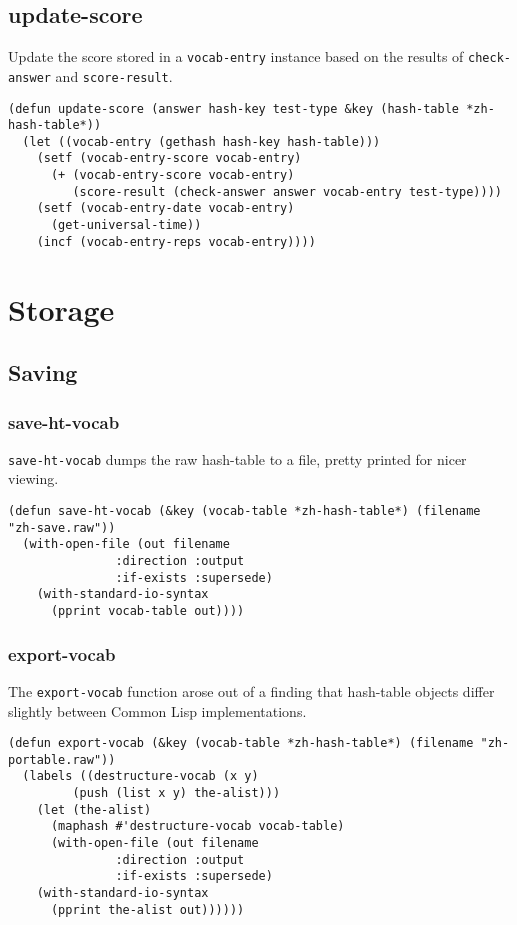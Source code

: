 \documentclass[11pt]{article}
\begin{document}
\subsection{update-score}
\label{sec-5-4}
Update the score stored in a \texttt{vocab-entry} instance based on the results of
\texttt{check-answer} and \texttt{score-result}.
\begin{verbatim}
(defun update-score (answer hash-key test-type &key (hash-table *zh-hash-table*))
  (let ((vocab-entry (gethash hash-key hash-table)))
    (setf (vocab-entry-score vocab-entry)
	  (+ (vocab-entry-score vocab-entry)
	     (score-result (check-answer answer vocab-entry test-type))))
    (setf (vocab-entry-date vocab-entry)
	  (get-universal-time))
    (incf (vocab-entry-reps vocab-entry))))
\end{verbatim}
\section{Storage}
\label{sec-6}
\subsection{Saving}
\label{sec-6-1}
\subsubsection*{save-ht-vocab}
\label{sec-6-1-1}
\texttt{save-ht-vocab} dumps the raw hash-table to a file, pretty printed for nicer viewing.
\begin{verbatim}
(defun save-ht-vocab (&key (vocab-table *zh-hash-table*) (filename "zh-save.raw"))
  (with-open-file (out filename
		       :direction :output
		       :if-exists :supersede)
    (with-standard-io-syntax
      (pprint vocab-table out))))
\end{verbatim}
\subsubsection*{export-vocab}
\label{sec-6-1-2}
The \texttt{export-vocab} function arose out of a finding that hash-table objects
differ slightly between Common Lisp implementations.
\begin{verbatim}
(defun export-vocab (&key (vocab-table *zh-hash-table*) (filename "zh-portable.raw"))
  (labels ((destructure-vocab (x y)
	     (push (list x y) the-alist)))
    (let (the-alist)
      (maphash #'destructure-vocab vocab-table)
      (with-open-file (out filename
			   :direction :output
			   :if-exists :supersede)
	(with-standard-io-syntax
	  (pprint the-alist out))))))
\end{verbatim}
\end{document}
